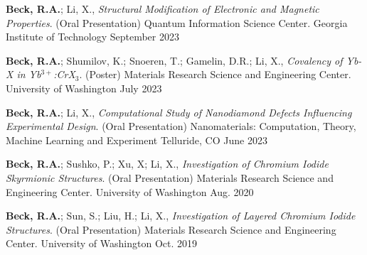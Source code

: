

\begin{cvpresentations}

\cvpresentation %
{\textbf{Beck, R.A.}; Li, X., \textit{Structural Modification of Electronic and Magnetic Properties}. (Oral Presentation) Quantum Information Science Center.}
{Georgia Institute of Technology} %
{September 2023} %

\cvpresentation %
{\textbf{Beck, R.A.}; Shumilov, K.; Snoeren, T.; Gamelin, D.R.; Li, X., \textit{Covalency of Yb-X in Yb$^{3+}$:CrX$_3$}. (Poster) Materials Research Science and Engineering Center.}
{University of Washington} %
{July 2023} %

\cvpresentation %
{\textbf{Beck, R.A.}; Li, X., \textit{Computational Study of Nanodiamond Defects Influencing Experimental Design}. (Oral Presentation) Nanomaterials: Computation, Theory, Machine Learning and Experiment}
{Telluride, CO} %
{June 2023} %

\cvpresentation %
{\textbf{Beck, R.A.}; Sushko, P.; Xu, X; Li, X., \textit{Investigation of Chromium Iodide Skyrmionic Structures}. (Oral Presentation) Materials Research Science and Engineering Center.}
{University of Washington} %
{Aug. 2020} %


\cvpresentation %
{\textbf{Beck, R.A.}; Sun, S.; Liu, H.; Li, X., \textit{Investigation of Layered Chromium Iodide Structures}. (Oral Presentation) Materials Research Science and Engineering Center.}
{University of Washington} %
{Oct. 2019} %



\end{cvpresentations}
